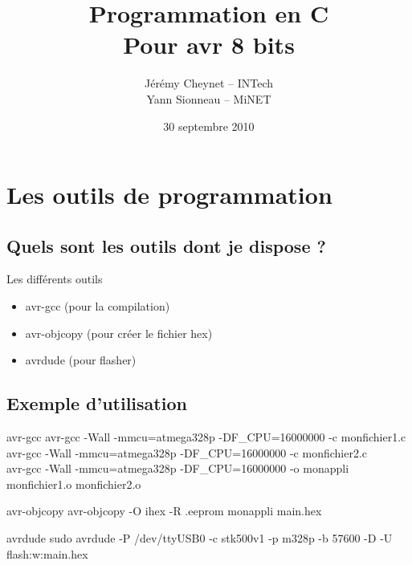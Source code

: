 \documentclass{beamer}
\title[Introduction au C avr]{Programmation en C\\Pour avr 8 bits}
\author{J\'er\'emy Cheynet -- INTech \\ Yann Sionneau -- MiNET}
\institute{www.club-intech.fr \\ clubcode.minet.net \\ intlab.minet.net}
\date{30 septembre 2010}
\begin{document}
 
\begin{frame}
  \titlepage
\end{frame}

\begin{frame}
  \tableofcontents[]
\end{frame}

\section{Les outils de programmation}
\subsection{Quels sont les outils dont je dispose ?}

\begin{frame}
  \tableofcontents[currentsection]
\end{frame}

\begin{frame}
  \begin{block}{Les diff\'erents outils}
    \begin{itemize}
      \pause
      \item avr-gcc (pour la compilation)
      \pause
      \item avr-objcopy (pour cr\'eer le fichier hex)
      \pause
      \item avrdude (pour flasher)
    \end{itemize}
  \end{block}
\end{frame}

\subsection{Exemple d'utilisation}

\begin{frame}
  \begin{exampleblock}{avr-gcc}
    \pause
    avr-gcc -Wall -mmcu=atmega328p -DF\_CPU=16000000 -c monfichier1.c\\
    \pause
    avr-gcc -Wall -mmcu=atmega328p -DF\_CPU=16000000 -c monfichier2.c\\
    \pause
    avr-gcc -Wall -mmcu=atmega328p -DF\_CPU=16000000 -o monappli monfichier1.o monfichier2.o
  \end{exampleblock}
  \pause
  \begin{exampleblock}{avr-objcopy}
    \pause
    avr-objcopy -O ihex -R .eeprom monappli main.hex
  \end{exampleblock}
  \pause
  \begin{exampleblock}{avrdude}
    \pause
    sudo avrdude -P /dev/ttyUSB0 -c stk500v1 -p m328p -b 57600 -D -U flash:w:main.hex
  \end{exampleblock}
\end{frame}
\end{document}
